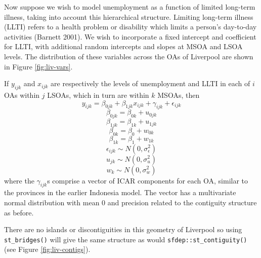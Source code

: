 Now suppose we wish to model unemployment as a function of limited long-term
illness, taking into account this hierarchical structure. Limiting long-term illness (LLTI) refers to a health problem or disability which limits a person's day-to-day activities (Barnett 2001). We wish to incorporate a fixed intercept and coefficient for LLTI, with additional random intercepts and slopes at MSOA and LSOA levels. The
distribution of these variables across the OAs of Liverpool are shown in Figure
\ref{fig:liv-vars}.

If \(y_{ijk}\) and \(x_{ijk}\) are respectively the levels of unemployment and LLTI in each of \(i\) OAs within \(j\) LSOAs, which in turn are within \(k\) MSOAs, then
\begin{equation}
y_{ijk} = \beta_{0jk} + \beta_{1jk}x_{ijk} + \gamma_{ijk} + \epsilon_{ijk}
\label{eq:eq9}
\end{equation}
\begin{equation}
\beta_{0jk} = \beta_{0k} + u_{0jk}
\label{eq:eq10}
\end{equation}
\begin{equation}
\beta_{1jk} = \beta_{1k} + u_{1jk}
\label{eq:eq11}
\end{equation}
\begin{equation}
\beta_{0k} = \beta_0 + w_{0k}
\label{eq:eq12}
\end{equation}
\begin{equation}
\beta_{1k} = \beta_1 + w_{1k}
\label{eq:eq13}
\end{equation}
\begin{equation}
\epsilon_{ijk} \sim N(0,\sigma_{\epsilon}^2)
\label{eq:eq14}
\end{equation}
\begin{equation}
u_{jk} \sim N(0,\sigma_{u}^2)
\label{eq:eq15}
\end{equation}
\begin{equation}
 w_{k} \sim N(0,\sigma_{w}^2)
\label{eq:eq16}
\end{equation}
where the \(\gamma_{ijk}\)s comprise a vector of ICAR components for each OA, similar to the provinces in the earlier Indonesia model. The vector has a multivariate normal distribution with mean 0 and precision related to the contiguity structure as before.

There are no islands or discontiguities in this geometry of Liverpool so
using \texttt{st\_bridges()} will give the same structure as would
\texttt{sfdep::st\_contiguity()} (see Figure \ref{fig:liv-contigs}).

